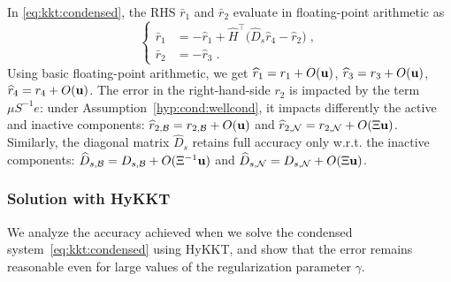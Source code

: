 In \eqref{eq:kkt:condensed}, the RHS $\bar{r}_1$ and $\bar{r}_2$
evaluate in floating-point arithmetic as
\begin{equation}
  \label{eq:cond:condensedrhs}
  \left\{
  \begin{aligned}
    \bar{r}_1 &= - \widehat{r}_1 + \widehat{H}^\top\big(\widehat{D}_{s} \widehat{r}_{4} - \widehat{r}_{2} \big) \;, \\
     \bar{r}_2 &= -\widehat{r}_3 \; .
  \end{aligned}
  \right.
\end{equation}
Using basic floating-point arithmetic, we get
$\widehat{r}_1 = r_1 + O(\mathbf{u})$,
$\widehat{r}_3 = r_3 + O(\mathbf{u})$,
$\widehat{r}_4 = r_4 + O(\mathbf{u})$.
The error in the right-hand-side $r_2$ is impacted by the term $\mu S^{-1}e$:
under Assumption~\ref{hyp:cond:wellcond}, it impacts differently
the active and inactive components:
$\widehat{r}_{2,\mathcal{B}}= r_{2,\mathcal{B}} + O(\mathbf{u})$ and
$\widehat{r}_{2,\mathcal{N}}= r_{2,\mathcal{N}} + O(\Xi \mathbf{u})$.
Similarly, the diagonal matrix $\widehat{D}_s$ retains full accuracy only
w.r.t. the inactive components: $\widehat{D}_{s,\mathcal{B}} = D_{s,\mathcal{B}} + O(\Xi^{-1} \mathbf{u})$
and $\widehat{D}_{s,\mathcal{N}} = D_{s,\mathcal{N}} + O(\Xi \mathbf{u})$.

\subsubsection{Solution with HyKKT}
We analyze the accuracy achieved when we solve the condensed system~\eqref{eq:kkt:condensed}
using HyKKT,
and show that the error remains reasonable even for large values of
the regularization parameter $\gamma$.

